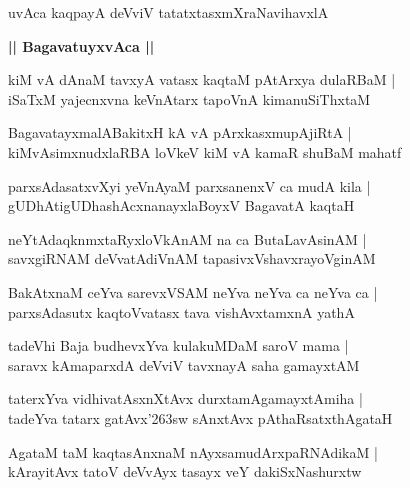 \documentclass[twoside,12pt,openright]{book}
\def\S{\char'263}
\newcounter{shloka}[chapter]
\def\uvaca#1{\centerline{{\large\textbf{#1}}}}
\begin{document}
\begin{shloka}%
uvAca kaqpayA deVviV tatatxtasxmXraNavihavxlA
\end{shloka}

\uvaca{|| BagavatuyxvAca ||}

\begin{shloka}%
kiM vA dAnaM tavxyA vatasx kaqtaM pAtArxya dulaRBaM |\\
iSaTxM yajecnxvna keVnAtarx tapoVnA kimanuSiThxtaM 
\end{shloka}

\begin{shloka}%
BagavatayxmalABakitxH kA vA pArxkasxmupAjiRtA |\\
kiMvAsimxnudxlaRBA loVkeV kiM vA kamaR shuBaM mahatf 
\end{shloka}

\begin{shloka}%
parxsAdasatxvXyi yeVnAyaM parxsanenxV ca mudA kila |\\
gUDhAtigUDhashAcxnanayxlaBoyxV BagavatA kaqtaH 
\end{shloka}

\begin{shloka}%
neYtAdaqknmxtaRyxloVkAnAM na ca ButaLavAsinAM |\\
savxgiRNAM deVvatAdiVnAM tapasivxVshavxrayoVginAM 
\end{shloka}

\begin{shloka}%
BakAtxnaM ceYva sarevxVSAM neYva neYva ca neYva ca |\\
parxsAdasutx kaqtoVvatasx tava vishAvxtamxnA yathA 
\end{shloka}

\begin{shloka}%
tadeVhi Baja budhevxYva kulakuMDaM saroV mama |\\
saravx kAmaparxdA deVviV tavxnayA saha gamayxtAM 
\end{shloka}

\begin{shloka}%
taterxYva vidhivatAsxnXtAvx durxtamAgamayxtAmiha |\\
tadeYva tatarx gatAvx\S sw sAnxtAvx pAthaRsatxthAgataH 
\end{shloka}

\begin{shloka}%
AgataM taM kaqtasAnxnaM nAyxsamudArxpaRNAdikaM |\\
kArayitAvx tatoV deVvAyx tasayx veY dakiSxNashurxtw
\end{shloka}
\end{document}
